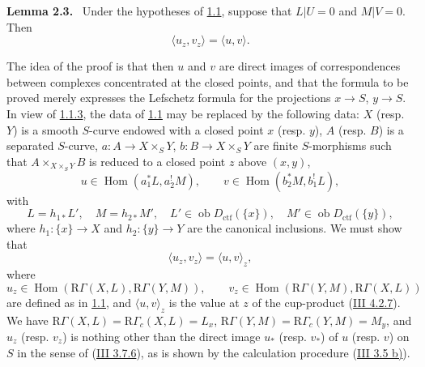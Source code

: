 \documentclass[11pt]{article}
\newenvironment{statement}[1]{\par\medskip\noindent\textbf{#1.}\ }{\par\medskip}
\DeclareMathOperator{\Hom}{Hom}
\providecommand{\Ob}{\operatorname{ob}}
\providecommand{\Hom}{\operatorname{Hom}}
\providecommand{\Ob}{\operatorname{ob}}
\providecommand{\Ob}{\operatorname{Ob}}
\providecommand{\Hom}{\operatorname{Hom}}
\providecommand{\Ob}{\operatorname{ob}}
\providecommand{\Ob}{\operatorname{Ob}}
\begin{document}
\label{sga5:IIIB:lemma:2.3}\begin{statement}{Lemma 2.3}
Under the hypotheses of \hyperref[sga5:IIIB:subsubsection:1.1]{1.1}, suppose that $L|U=0$ and $M|V=0$. Then
\[
\langle u_z,v_z\rangle=\langle u,v\rangle .
\]
\end{statement}

The idea of the proof is that then $u$ and $v$ are direct images of correspondences between complexes concentrated at the closed points, and that the formula to be proved merely expresses the Lefschetz formula for the projections $x\to S$, $y\to S$. In view of \hyperref[sga5:IIIB:subsubsection:1.1.3]{1.1.3}, the data of \hyperref[sga5:IIIB:subsubsection:1.1]{1.1} may be replaced by the following data: $X$ (resp. $Y$) is a smooth $S$-curve endowed with a closed point $x$ (resp. $y$), $A$ (resp. $B$) is a separated $S$-curve, $a:A\to X\times_S Y$, $b:B\to X\times_S Y$ are finite $S$-morphisms such that $A\times_{X\times_SY}B$ is reduced to a closed point $z$ above $(x,y)$,
\[
u\in\Hom(a_1^*L,a_2^!M),\qquad v\in\Hom(b_2^*M,b_1^!L),
\]
with
\[
L=h_{1*}L',\quad M=h_{2*}M',\quad
L'\in\Ob D_{\mathrm{ctf}}(\{x\}),\quad M'\in\Ob D_{\mathrm{ctf}}(\{y\}),
\]
where $h_1:\{x\}\to X$ and $h_2:\{y\}\to Y$ are the canonical inclusions. We must show that
\[
\langle u_z,v_z\rangle=\langle u,v\rangle_z,
\]
where
\[
u_z\in\Hom(\mathrm R\Gamma(X,L),\mathrm R\Gamma(Y,M)),\qquad
v_z\in\Hom(\mathrm R\Gamma(Y,M),\mathrm R\Gamma(X,L))
\]
are defined as in \hyperref[sga5:IIIB:subsubsection:1.1]{1.1}, and $\langle u,v\rangle_z$ is the value at $z$ of the cup-product (\hyperref[sga5:III:equation:4.2.7]{III 4.2.7}). We have $\mathrm R\Gamma(X,L)=\mathrm R\Gamma_c(X,L)=L_x$, $\mathrm R\Gamma(Y,M)=\mathrm R\Gamma_c(Y,M)=M_y$, and $u_z$ (resp. $v_z$) is nothing other than the direct image $u_*$ (resp. $v_*$) of $u$ (resp. $v$) on $S$ in the sense of (\hyperref[sga5:III:equation:3.7.6]{III 3.7.6}), as is shown by the calculation procedure (\hyperref[sga5:III:corollary:3.5]{III 3.5 b)}).
\end{document}
